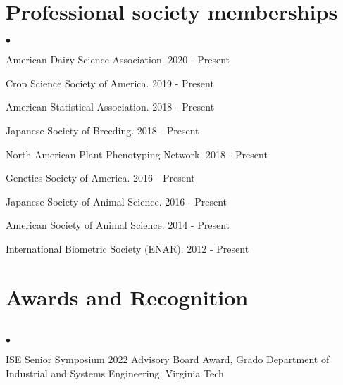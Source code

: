 \documentclass[margin,line,10pt]{res}
\newenvironment{list2}{
  \begin{list}{$\bullet$}{%
      \setlength{\itemsep}{0in}
      \setlength{\parsep}{0in} \setlength{\parskip}{0in}
      \setlength{\topsep}{0in} \setlength{\partopsep}{0in} 
      \setlength{\leftmargin}{0.2in}}}{\end{list}}
\begin{document}
\begin{resume}
\section{\sc Professional society memberships}
\begin{list2}
  \item American Dairy Science Association. 2020 - Present
    \vspace{0.3cm}
  \item Crop Science Society of America. 2019 - Present
    \vspace{0.3cm}
  \item American Statistical Association. 2018 - Present
    \vspace{0.3cm}
  \item  Japanese Society of Breeding. 2018 - Present
      \vspace{0.3cm}
\item North American Plant Phenotyping Network. 2018 - Present
  \vspace{0.3cm}
\item  Genetics Society of America. 2016 - Present
  \vspace{0.3cm}
\item  Japanese Society of Animal Science. 2016 - Present
  \vspace{0.3cm}
\item American Society of Animal Science. 2014 - Present
  \vspace{0.3cm}
\item International Biometric Society (ENAR). 2012 - Present
\end{list2}


\vspace{0.5cm}
\section{\sc Awards and Recognition}
\vspace{1cm}
\section{}
\begin{list2}
  \item ISE Senior Symposium 2022 Advisory Board Award, Grado Department of Industrial and Systems Engineering, Virginia Tech 
\end{list2}




\end{resume}
\end{document}
